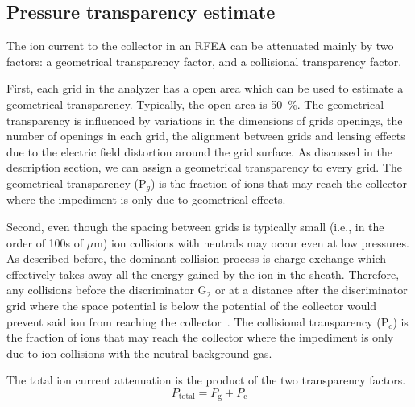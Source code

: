 \subsection{Pressure transparency estimate}
The ion current to the collector in an RFEA can be attenuated mainly by two factors: a geometrical transparency factor, and a collisional transparency factor.  

First, each grid in the analyzer has a open area which can be used to estimate a geometrical transparency. Typically, the open area is 50~\%. The geometrical transparency is influenced by variations in the dimensions of grids openings, the number of openings in each grid, the alignment between grids and lensing effects due to the electric field distortion around the grid surface. As discussed in the description section, we can assign a geometrical transparency to every grid. The geometrical transparency (P$_g$) is the fraction of ions that may reach the collector where the impediment is only due to geometrical effects.  

Second, even though the spacing between grids is typically small (i.e., in the order of 100s of $\mu$m) ion collisions with neutrals may occur even at low pressures. As described before, the dominant collision process is charge exchange which effectively takes away all the energy gained by the ion in the sheath. Therefore, any collisions before the discriminator G$_2$ or at a distance after the discriminator grid where the space potential is below the potential of the collector would prevent said ion from reaching the collector~\cite{Baloniak2010}. The collisional transparency (P$_c$) is the fraction of ions that may reach the collector where the impediment is only due to ion collisions with the neutral background gas. 

The total ion current attenuation is the product of the two transparency factors.
\begin{equation}
P_{\text{total}} = P_\text{g} + P_\text{c}
\end{equation}

